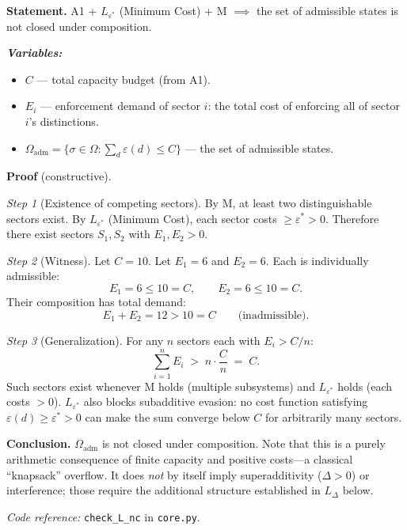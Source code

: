 \documentclass[11pt]{article}
\newenvironment{varlist}{\begin{itemize}[nosep,leftmargin=2em]}{\end{itemize}}
\newcommand{\coderef}[2]{\smallskip\noindent\textit{Code reference:} \texttt{#1} in \texttt{#2}.}
\begin{document}
\begin{tcolorbox}[apfbox, title={Lemma $L_{\mathrm{nc}}$ (Non-Closure)}]
\textbf{Statement.}  A1 + $L_{\varepsilon^*}$ (Minimum Cost) + M $\implies$ the set of admissible states is not closed under composition.

\smallskip\noindent\textbf{\textit{Variables:}}
\begin{varlist}
\item $C$ --- total capacity budget (from A1).
\item $E_i$ --- enforcement demand of sector $i$: the total cost of enforcing all of sector $i$'s distinctions.
\item $\Omega_{\mathrm{adm}} = \{\sigma \in \Omega : \sum_d \varepsilon(d) \le C\}$ --- the set of admissible states.
\end{varlist}

\smallskip\noindent\textbf{Proof} (constructive).

\textit{Step 1} (Existence of competing sectors).  By M, at least two distinguishable sectors exist.  By $L_{\varepsilon^*}$ (Minimum Cost), each sector costs $\ge \varepsilon^* > 0$.  Therefore there exist sectors $S_1, S_2$ with $E_1, E_2 > 0$.

\textit{Step 2} (Witness).  Let $C = 10$.  Let $E_1 = 6$ and $E_2 = 6$.  Each is individually admissible:
\begin{equation}
E_1 = 6 \le 10 = C, \qquad E_2 = 6 \le 10 = C.
\end{equation}
Their composition has total demand:
\begin{equation}
E_1 + E_2 = 12 > 10 = C \qquad \text{(inadmissible)}.
\end{equation}

\textit{Step 3} (Generalization).  For any $n$ sectors each with $E_i > C/n$:
\begin{equation}
\sum_{i=1}^{n} E_i \;>\; n \cdot \frac{C}{n} \;=\; C.
\end{equation}
Such sectors exist whenever M holds (multiple subsystems) and $L_{\varepsilon^*}$ holds (each costs $> 0$).  $L_{\varepsilon^*}$ also blocks subadditive evasion: no cost function satisfying $\varepsilon(d) \ge \varepsilon^* > 0$ can make the sum converge below $C$ for arbitrarily many sectors.

\smallskip\noindent\textbf{Conclusion.}  $\Omega_{\mathrm{adm}}$ is not closed under composition.  Note that this is a purely arithmetic consequence of finite capacity and positive costs---a classical ``knapsack'' overflow.  It does \emph{not} by itself imply superadditivity ($\Delta > 0$) or interference; those require the additional structure established in $L_\Delta$ below.

\coderef{check\_L\_nc}{core.py}
\end{tcolorbox}
\end{document}
